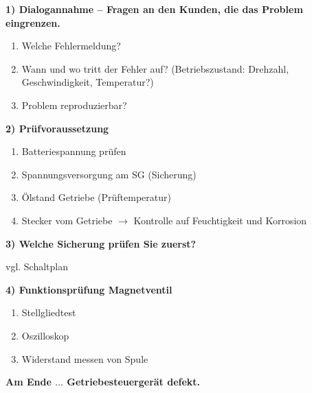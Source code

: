 \textbf{1) Dialogannahme -- Fragen an den Kunden, die das Problem
eingrenzen.}

\begin{enumerate}
\item
  Welche Fehlermeldung?
\item
  Wann und wo tritt der Fehler auf? (Betriebszustand: Drehzahl,
  Geschwindigkeit, Temperatur?)
\item
  Problem reproduzierbar?
\end{enumerate}

\textbf{2) Prüfvoraussetzung}

\begin{enumerate}
\item
  Batteriespannung prüfen
\item
  Spannungsversorgung am SG (Sicherung)
\item
  Ölstand Getriebe (Prüftemperatur)
\item
  Stecker vom Getriebe $\to$ Kontrolle auf Feuchtigkeit und Korrosion
\end{enumerate}

\textbf{3) Welche Sicherung prüfen Sie zuerst?}

vgl. Schaltplan

\textbf{4) Funktionsprüfung Magnetventil}

\begin{enumerate}
\item
  Stellgliedtest
\item
  Oszilloskop
\item
  Widerstand messen von Spule
\end{enumerate}

\textbf{Am Ende $\dots$ Getriebesteuergerät defekt.}

